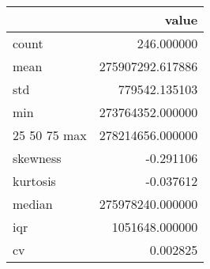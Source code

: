 \begin{tabular}{lr}
\toprule
 & value \\
\midrule
count & 246.000000 \\
mean & 275907292.617886 \\
std & 779542.135103 \\
min & 273764352.000000 \\
25%
50%
75%
max & 278214656.000000 \\
skewness & -0.291106 \\
kurtosis & -0.037612 \\
median & 275978240.000000 \\
iqr & 1051648.000000 \\
cv & 0.002825 \\
\bottomrule
\end{tabular}
